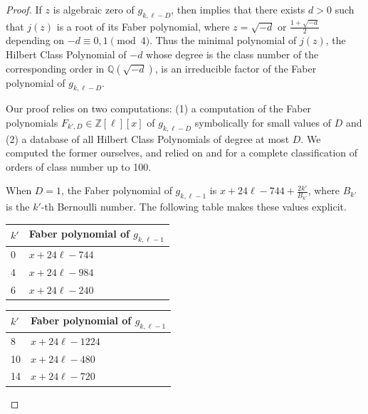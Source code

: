 \documentclass[12pt]{amsart}
\theoremstyle{plain} %
\theoremstyle{definition}
\theoremstyle{remark}
\numberwithin{equation}{section}
\begin{document}
\begin{proof}
If $z$ is algebraic zero of $g_{k,\ell-D}$, then \cite[Thm
1]{kohnen:eisenstein} implies that there exists $d>0$ such that
$j(z)$ is a root of its Faber polynomial, where $z=\sqrt{-d}$ or
$\frac{1+\sqrt{-d}}{2}$ depending on $-d\equiv 0,1\pmod{4}$. Thus the minimal polynomial of $j(z)$, the Hilbert Class Polynomial of $-d$ whose degree is the class number of the corresponding order in $\mathbb{Q}(\sqrt{-d})$, is an irreducible factor of the Faber polynomial of $g_{k,\ell-D}$. 

Our proof relies on two computations: (1) a computation of the Faber polynomials $F_{k',D}\in \mathbb{Z}[\ell][x]$ of $g_{k,\ell-D}$ symbolically for small
values of $D$ and (2) a database of all Hilbert Class Polynomials of degree at most $D$. We computed the former ourselves, and relied on \cite{watkins:classno} and \cite{klaise:orders} for a complete classification of orders of class number up to 100.



When $D=1$, the Faber polynomial of $g_{k,\ell-1}$ is 
$\displaystyle x+24\ell-744+\frac{2k'}{B_{k'}}$, where $B_{k'}$ is the $k'$-th Bernoulli number. The following table makes these values explicit. 
\begin{table}[h]
\centering

\begin{minipage}{0.45\textwidth}
\centering
\begin{tabular}{ll}
  $k'$ & Faber polynomial of $g_{k,\ell-1}$\\
  \hline
  0  & $x + 24\ell - 744$\\
  4  & $x + 24\ell - 984$\\
  6  & $x + 24\ell - 240$\\
\end{tabular}
\end{minipage}
\hfill
\begin{minipage}{0.45\textwidth}
\centering
\begin{tabular}{ll}
  $k'$ & Faber polynomial of $g_{k,\ell-1}$\\
  \hline
  8   & $x + 24\ell - 1224$\\
  10  & $x + 24\ell - 480$\\
  14  & $x + 24\ell - 720$\\
\end{tabular}
\end{minipage}


\end{table}
\end{proof}
\end{document}

